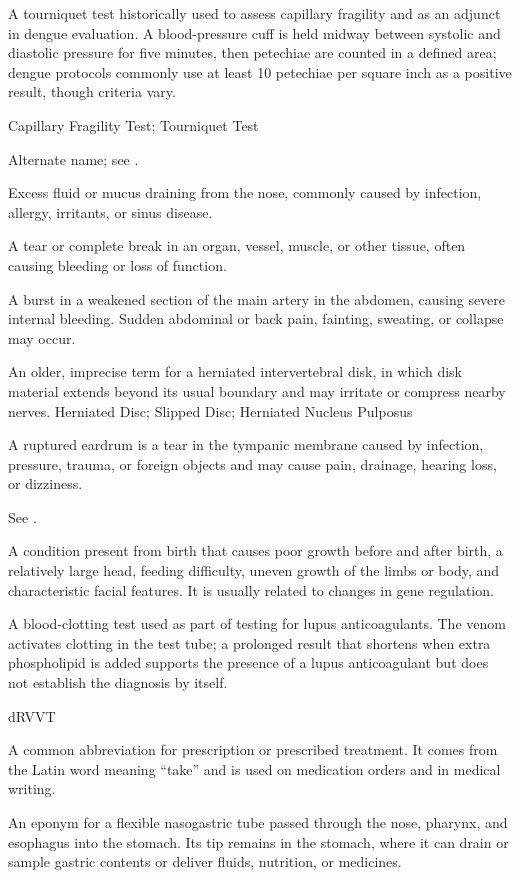  A tourniquet test historically used to assess capillary fragility and as an adjunct in dengue evaluation. A blood-pressure cuff is held midway between systolic and diastolic pressure for five minutes, then petechiae are counted in a defined area; dengue protocols commonly use at least 10 petechiae per square inch as a positive result, though criteria vary.

\synonyms
Capillary Fragility Test; Tourniquet Test

 Alternate name; see .

 Excess fluid or mucus draining from the nose, commonly caused by infection, allergy, irritants, or sinus disease.

 A tear or complete break in an organ, vessel, muscle, or other tissue, often causing bleeding or loss of function.

 A burst in a weakened section of the main artery in the abdomen, causing severe internal bleeding. Sudden abdominal or back pain, fainting, sweating, or collapse may occur.

 An older, imprecise term for a herniated intervertebral disk, in which disk material extends beyond its usual boundary and may irritate or compress nearby nerves.
\synonyms
Herniated Disc; Slipped Disc; Herniated Nucleus Pulposus

 A ruptured eardrum is a tear in the tympanic membrane caused by infection, pressure, trauma, or foreign objects and may cause pain, drainage, hearing loss, or dizziness.

 See .

 A condition present from birth that causes poor growth before and after birth, a relatively large head, feeding difficulty, uneven growth of the limbs or body, and characteristic facial features. It is usually related to changes in gene regulation.

 A blood-clotting test used as part of testing for lupus anticoagulants. The venom activates clotting in the test tube; a prolonged result that shortens when extra phospholipid is added supports the presence of a lupus anticoagulant but does not establish the diagnosis by itself.

\synonyms
dRVVT

 A common abbreviation for prescription or prescribed treatment. It comes from the Latin word meaning “take” and is used on medication orders and in medical writing.

 An eponym for a flexible nasogastric tube passed through the nose, pharynx, and esophagus into the stomach.
Its tip remains in the stomach, where it can drain or sample gastric contents or deliver fluids, nutrition, or medicines.
